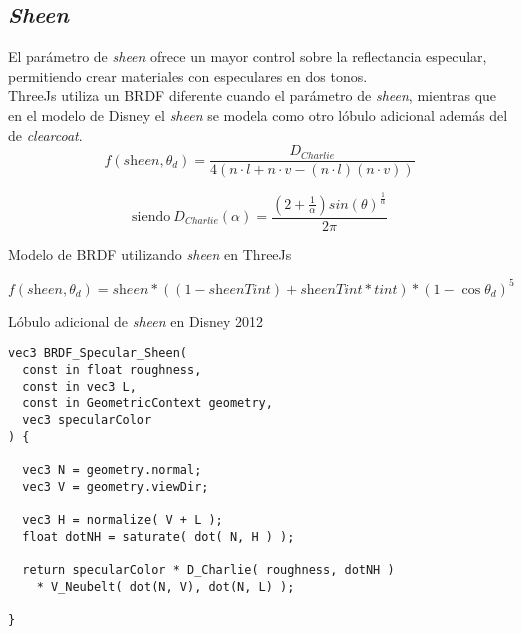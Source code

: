   \subsection*{\textit{Sheen}}
  El par\'ametro de \textit{sheen} ofrece un mayor control sobre la reflectancia especular, permitiendo crear materiales con
  especulares en dos tonos.\\

  ThreeJs utiliza un BRDF diferente cuando el par\'ametro de \textit{sheen}, mientras que en el modelo de Disney el \textit{sheen}
  se modela como otro l\'obulo adicional adem\'as del de \textit{clearcoat}.\\

  $$
  f(\textit{sheen}, \theta_d) =\frac{D_{Charlie}}{4(n\cdot{l} + n\cdot{v} - (n\cdot{l})(n\cdot{v}) )}
  $$
  \begin{eqfloat}[!htb]
    \begin{equation}
      \textrm{siendo}\ D_{Charlie}(\alpha) = \frac
      {(2 + \frac{1}{\alpha})sin(\theta)^\frac{1}{\alpha}}
      {2\pi}
    \end{equation}
  \caption{Modelo de BRDF utilizando \textit{sheen} en ThreeJs}
  \end{eqfloat}
  \singlespacing

  \begin{eqfloat}[!htb]
    \begin{equation}
      f(\textit{sheen}, \theta_d) = \textit{sheen} * ((1 - \textit{sheenTint}) + \textit{sheenTint} * \textit{tint}) * (1 - \cos\theta_d)^5
    \end{equation}
  \caption{L\'obulo adicional de \textit{sheen} en Disney 2012}
  \end{eqfloat}
  \singlespacing

  \begin{lstlisting}[caption={BRDF del modelo de \textit{sheen} de ThreeJs}]
vec3 BRDF_Specular_Sheen(
  const in float roughness,
  const in vec3 L,
  const in GeometricContext geometry,
  vec3 specularColor
) {

  vec3 N = geometry.normal;
  vec3 V = geometry.viewDir;

  vec3 H = normalize( V + L );
  float dotNH = saturate( dot( N, H ) );

  return specularColor * D_Charlie( roughness, dotNH )
    * V_Neubelt( dot(N, V), dot(N, L) );

}
  \end{lstlisting}